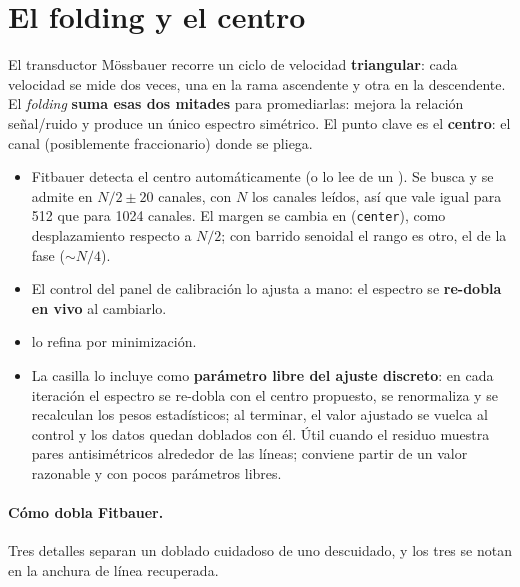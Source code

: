 \section{El folding y el centro}
\label{sec:folding}

El transductor Mössbauer recorre un ciclo de velocidad \textbf{triangular}: cada
velocidad se mide dos veces, una en la rama ascendente y otra en la descendente.
El \emph{folding} \textbf{suma esas dos mitades} para promediarlas: mejora la
relación señal/ruido y produce un único espectro simétrico. El punto clave es el
\textbf{centro}: el canal (posiblemente fraccionario) donde se pliega.

\begin{itemize}[nosep]
  \item Fitbauer detecta el centro automáticamente (o lo lee de un ).
        Se busca y se admite en $N/2 \pm 20$ canales, con $N$ los canales
        leídos, así que vale igual para 512 que para 1024 canales. El margen se
        cambia en 
        (\texttt{center}), como desplazamiento respecto a $N/2$; con barrido
        senoidal el rango es otro, el de la fase ($\sim N/4$).
  \item El control  del panel de calibración lo ajusta a mano: el
        espectro se \textbf{re-dobla en vivo} al cambiarlo.
  \item {} lo refina por minimización.
  \item La casilla  lo incluye
        como \textbf{parámetro libre del ajuste discreto}: en cada iteración el
        espectro se re-dobla con el centro propuesto, se renormaliza y se
        recalculan los pesos estadísticos; al terminar, el valor ajustado se
        vuelca al control  y los datos quedan doblados con él.
        Útil cuando el residuo muestra pares antisimétricos alrededor de las
        líneas; conviene partir de un valor razonable y con pocos parámetros
        libres.
\end{itemize}

\paragraph{Cómo dobla Fitbauer.} Tres detalles separan un doblado cuidadoso de
uno descuidado, y los tres se notan en la anchura de línea recuperada.

